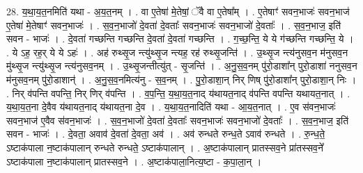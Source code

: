\documentclass[17pt]{extarticle}
\begin{document}
28. य॒था॒य॒त॒नमिति॑ यथा - अ॒य॒त॒नम् । . वा ए॒तेषा॑ मे॒तेषां॒ ॅवै वा ए॒तेषा᳚म् । . ए॒तेषाꣳ॑ सवन॒भाजः॑ सवन॒भाज॑ ए॒तेषा॑ मे॒तेषाꣳ॑ सवन॒भाजः॑ । . स॒व॒न॒भाजो॑ दे॒वता॑ दे॒वताः᳚ सवन॒भाजः॑ सवन॒भाजो॑ दे॒वताः᳚ । . स॒व॒न॒भाज॒ इति॑ सवन - भाजः॑ । . दे॒वता॑ गच्छन्ति गच्छन्ति दे॒वता॑ दे॒वता॑ गच्छन्ति । . ग॒च्छ॒न्ति॒ ये ये ग॑च्छन्ति गच्छन्ति॒ ये । . ये ऽह॒ रह॒र् ये ये ऽहः॑ । . अह॑ रुथ्सृ॒ज न्त्यु॑थ्सृ॒ज न्त्यह॒ रह॑ रुथ्सृ॒जन्ति॑ । . उ॒थ्सृ॒ज न्त्य॑नुसव॒न म॑नुसव॒न मु॑थ्सृ॒ज न्त्यु॑थ्सृ॒ज न्त्य॑नुसव॒नम् । . उ॒थ्सृ॒जन्तीत्यु॑त् - सृ॒जन्ति॑ । . अ॒नु॒स॒व॒नम् पु॑रो॒डाशा᳚न् पुरो॒डाशा॑ ननुसव॒न म॑नुसव॒नम् पु॑रो॒डाशान्॑ । . अ॒नु॒स॒व॒नमित्य॑नु - स॒व॒नम् । . पु॒रो॒डाशा॒न् निर् णिष् पु॑रो॒डाशा᳚न् पुरो॒डाशा॒न् निः । . निर् व॑पन्ति वपन्ति॒ निर् णिर् व॑पन्ति । . व॒प॒न्ति॒ य॒था॒य॒त॒नाद् य॑थायत॒नाद् व॑पन्ति वपन्ति यथायत॒नात् । . य॒था॒य॒त॒ना दे॒वैव य॑थायत॒नाद् य॑थायत॒ना दे॒व । . य॒था॒य॒त॒नादिति॑ यथा - आ॒य॒त॒नात् । . ए॒व स॑वन॒भाजः॑ सवन॒भाज॑ ए॒वैव स॑वन॒भाजः॑ । . स॒व॒न॒भाजो॑ दे॒वता॑ दे॒वताः᳚ सवन॒भाजः॑ सवन॒भाजो॑ दे॒वताः᳚ । . स॒व॒न॒भाज॒ इति॑ सवन - भाजः॑ । . दे॒वता॒ अवाव॑ दे॒वता॑ दे॒वता॒ अव॑ । . अव॑ रुन्धते रुन्ध॒ते ऽवाव॑ रुन्धते । . रु॒न्ध॒ते॒ ऽष्टाक॑पाला न॒ष्टाक॑पालान् रुन्धते रुन्धते॒ ऽष्टाक॑पालान् । . अ॒ष्टाक॑पालान् प्रातस्सव॒ने प्रा॑तस्सव॒ने᳚ ऽष्टाक॑पाला न॒ष्टाक॑पालान् प्रातस्सव॒ने । . अ॒ष्टाक॑पाला॒नित्य॒ष्टा - क॒पा॒ला॒न् । \newline
\end{document}
